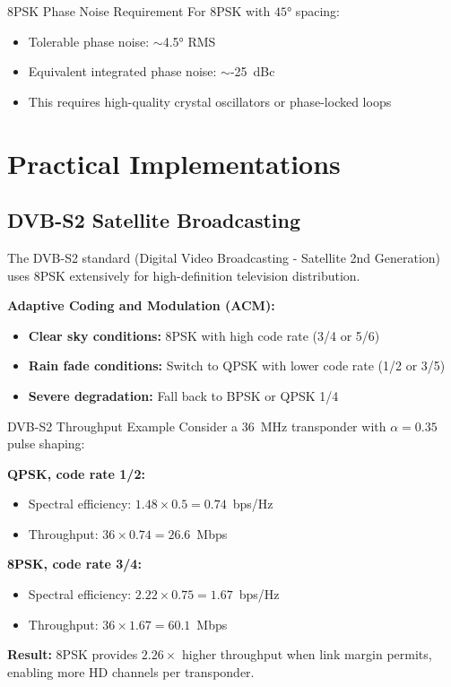 \begin{calloutbox}{8PSK Phase Noise Requirement}
For 8PSK with $45°$ spacing:
\begin{itemize}
\item Tolerable phase noise: $\sim$4.5° RMS
\item Equivalent integrated phase noise: $\sim$-25~dBc
\item This requires high-quality crystal oscillators or phase-locked loops
\end{itemize}
\end{calloutbox}

\section{Practical Implementations}

\subsection{DVB-S2 Satellite Broadcasting}

The DVB-S2 standard (Digital Video Broadcasting - Satellite 2nd Generation) uses 8PSK extensively for high-definition television distribution.

\textbf{Adaptive Coding and Modulation (ACM):}
\begin{itemize}
\item \textbf{Clear sky conditions:} 8PSK with high code rate (3/4 or 5/6)
\item \textbf{Rain fade conditions:} Switch to QPSK with lower code rate (1/2 or 3/5)
\item \textbf{Severe degradation:} Fall back to BPSK or QPSK 1/4
\end{itemize}

\begin{calloutbox}{DVB-S2 Throughput Example}
Consider a 36~MHz transponder with $\alpha = 0.35$ pulse shaping:

\textbf{QPSK, code rate 1/2:}
\begin{itemize}
\item Spectral efficiency: $1.48 \times 0.5 = 0.74$~bps/Hz
\item Throughput: $36 \times 0.74 = 26.6$~Mbps
\end{itemize}

\textbf{8PSK, code rate 3/4:}
\begin{itemize}
\item Spectral efficiency: $2.22 \times 0.75 = 1.67$~bps/Hz
\item Throughput: $36 \times 1.67 = 60.1$~Mbps
\end{itemize}

\textbf{Result:} 8PSK provides $\mathbf{2.26\times}$ higher throughput when link margin permits, enabling more HD channels per transponder.
\end{calloutbox}

